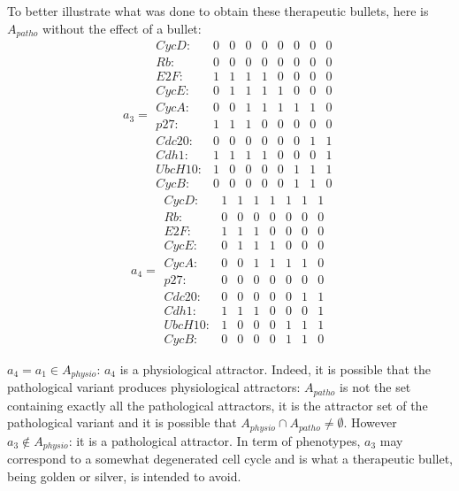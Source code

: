 \documentclass[oneside,a4paper,onecolumn,notitlepage,final]{article}
\begin{document}
To better illustrate what was done to obtain these therapeutic bullets, here is $A_{patho}$ without the effect of a bullet:
\begin{equation*}
a_{3}=
\begin{matrix}
CycD:&0&0&0&0&0&0&0&0\\
Rb:&0&0&0&0&0&0&0&0\\
E2F:&1&1&1&1&0&0&0&0\\
CycE:&0&1&1&1&1&0&0&0\\
CycA:&0&0&1&1&1&1&1&0\\
p27:&1&1&1&0&0&0&0&0\\
Cdc20:&0&0&0&0&0&0&1&1\\
Cdh1:&1&1&1&1&0&0&0&1\\
UbcH10:&1&0&0&0&0&1&1&1\\
CycB:&0&0&0&0&0&1&1&0
\end{matrix}
\end{equation*}
\begin{equation*}
a_{4}=
\begin{matrix}
CycD:&1&1&1&1&1&1&1\\
Rb:&0&0&0&0&0&0&0\\
E2F:&1&1&1&0&0&0&0\\
CycE:&0&1&1&1&0&0&0\\
CycA:&0&0&1&1&1&1&0\\
p27:&0&0&0&0&0&0&0\\
Cdc20:&0&0&0&0&0&1&1\\
Cdh1:&1&1&1&0&0&0&1\\
UbcH10:&1&0&0&0&1&1&1\\
CycB:&0&0&0&0&1&1&0
\end{matrix}
\end{equation*}

$a_{4}=a_{1}\in A_{physio}$: $a_{4}$ is a physiological attractor. Indeed, it is possible that the pathological variant produces physiological attractors: $A_{patho}$ is not the set containing exactly all the pathological attractors, it is the attractor set of the pathological variant and it is possible that $A_{physio}\cap A_{patho}\neq \emptyset$. However $a_3\notin A_{physio}$: it is a pathological attractor. In term of phenotypes, $a_3$ may correspond to a somewhat degenerated cell cycle and is what a therapeutic bullet, being golden or silver, is intended to avoid.
\end{document}
